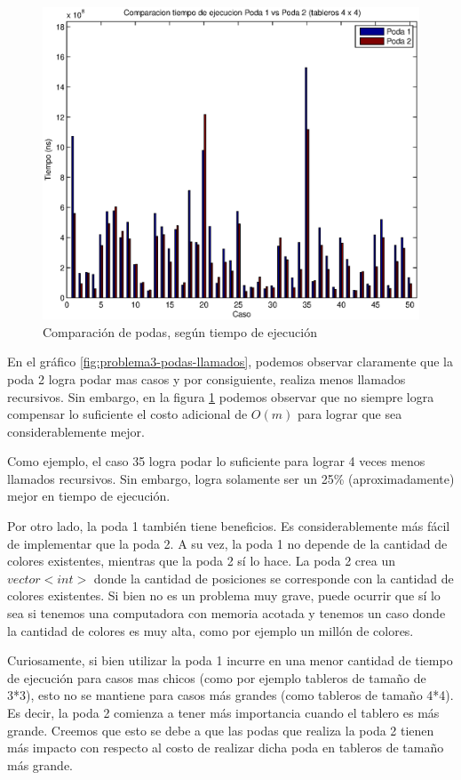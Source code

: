 \begin{center}
  \begin{figure}[H]
\includegraphics[width=\linewidth]{problema3/graficos/comparacion_podas1y2_tiempo.eps}
    \caption{Comparación de podas, según tiempo de ejecución}
    \label{fig:problema3-podas-tiempo}
  \end{figure}
\end{center}


En el gráfico \ref{fig:problema3-podas-llamados}, podemos observar claramente que la poda 2 logra podar mas casos y por consiguiente, realiza menos llamados recursivos. Sin embargo, en la figura \ref{fig:problema3-podas-tiempo} podemos observar que no siempre logra compensar lo suficiente el costo adicional de $O(m)$ para lograr que sea considerablemente mejor.

Como ejemplo, el caso 35 logra podar lo suficiente para lograr 4 veces menos llamados recursivos. Sin embargo, logra solamente ser un 25\% (aproximadamente) mejor en tiempo de ejecución.

Por otro lado, la poda 1 también tiene beneficios. Es considerablemente más fácil de implementar que la poda 2. A su vez, la poda 1 no depende de la cantidad de colores existentes, mientras que la poda 2 sí lo hace. La poda 2 crea un $vector<int>$ donde la cantidad de posiciones se corresponde con la cantidad de colores existentes. Si bien no es un problema muy grave, puede ocurrir que sí lo sea si tenemos una computadora con memoria acotada y tenemos un caso donde la cantidad de colores es muy alta, como por ejemplo un millón de colores.

Curiosamente, si bien utilizar la poda 1 incurre en una menor cantidad de tiempo de ejecución para casos mas chicos (como por ejemplo tableros de tamaño de 3*3), esto no se mantiene para casos más grandes (como tableros de tamaño 4*4). Es decir, la poda 2 comienza a tener más importancia cuando el tablero es más grande. Creemos que esto se debe a que las podas que realiza la poda 2 tienen más impacto con respecto al costo de realizar dicha poda en tableros de tamaño más grande.